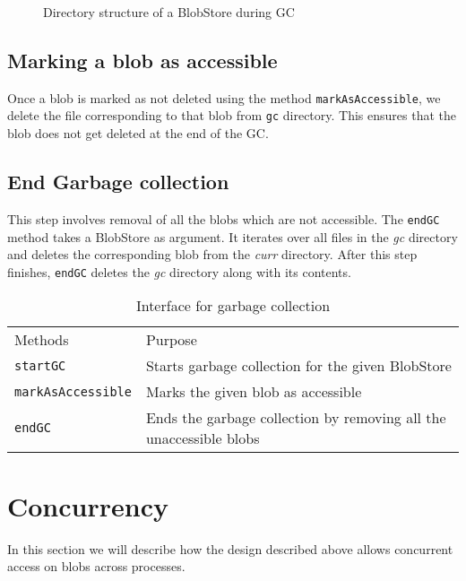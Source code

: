 \begin{figure}[hbt]
  \caption{Directory structure of a BlobStore during GC}
  \label{fig:blobstore-dirstructure-gc}
\end{figure}

\subsection{Marking a blob as accessible}
Once a blob is marked as not deleted using the method \texttt{markAsAccessible}, we delete the file corresponding to that blob from \texttt{gc} directory. This ensures that the blob does not get deleted at the end of the GC.

\subsection{End Garbage collection}
This step involves removal of all the blobs which are not accessible. The \texttt{endGC} method takes a BlobStore as argument. It iterates over all files in the \textit{gc} directory and deletes the corresponding blob from the \textit{curr} directory.
After this step finishes, \texttt{endGC} deletes the \textit{gc} directory along with its contents.

\begin{table}[hbt]
\caption{Interface for garbage collection}
\label{tab:interface-gc}
\begin{center}
  \begin{tabularx}{0.91\textwidth}{lX}
    \hline\noalign{\smallskip}
    Methods & Purpose \\
    \noalign{\smallskip}
    \hline
    \noalign{\smallskip}
    \texttt{startGC} & Starts garbage collection for the given BlobStore\\
    \texttt{markAsAccessible} & Marks the given blob as accessible\\
    \texttt{endGC} & Ends the garbage collection by removing all the unaccessible blobs\\
    \hline
  \end{tabularx}
\end{center}
\end{table}

\section{Concurrency}
In this section we will describe how the design described above allows concurrent access on blobs across processes.

